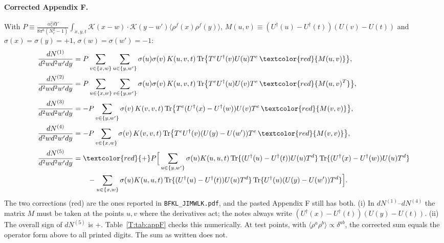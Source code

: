 \documentclass[10pt]{article}
\numberwithin{equation}{section}
\newcommand{\KK}{\mathcal K}
\newcommand{\Ud}{U^{\dagger}}
\newcommand{\Tr}{{\rm Tr}}
\begin{document}
\paragraph{Corrected Appendix F.} With $P\equiv\frac{\alpha_s^2\delta Y}{8\pi^6(N_c^2-1)}\int_{x,y,t}\KK(x-w)\cdot\KK(y-w')\langle\rho^f(x)\rho^f(y)\rangle$, $M(u,v)\equiv(\Ud(u)-\Ud(t))(U(v)-U(t))$ and $\sigma(x)=\sigma(y)=+1$, $\sigma(w)=\sigma(w')=-1$:
\begin{align}
\frac{dN^{(1)}}{d^2wd^2w'dy}&=P\sum_{v\in\{x,w\}}\sum_{u\in\{y,w'\}}\sigma(u)\sigma(v)\,K(u,v,t)\,\Tr\big\{T^e\Ud(v)U(u)T^e\,\textcolor{red}{M(u,v)}\big\},\notag\\
\frac{dN^{(2)}}{d^2wd^2w'dy}&=P\sum_{u\in\{x,w\}}\sum_{v\in\{y,w'\}}\sigma(u)\sigma(v)\,K(u,v,t)\,\Tr\big\{T^e\Ud(u)U(v)T^e\,\textcolor{red}{M(u,v)^T}\big\},\notag\\
\frac{dN^{(3)}}{d^2wd^2w'dy}&=-P\sum_{v\in\{y,w'\}}\sigma(v)\,K(v,v,t)\,\Tr\big\{T^e(\Ud(x)-\Ud(w))U(v)T^e\,\textcolor{red}{M(v,v)}\big\},\notag\\
\frac{dN^{(4)}}{d^2wd^2w'dy}&=-P\sum_{v\in\{x,w\}}\sigma(v)\,K(v,v,t)\,\Tr\big\{T^e\Ud(v)(U(y)-U(w'))T^e\,\textcolor{red}{M(v,v)}\big\},\notag\\
\frac{dN^{(5)}}{d^2wd^2w'dy}&=\textcolor{red}{+}P\Big[\sum_{u\in\{y,w'\}}\sigma(u)K(u,u,t)\,\Tr\{(\Ud(u)-\Ud(t))U(u)T^d\}\,\Tr\{(\Ud(x)-\Ud(w))U(u)T^d\}\notag\\
&\qquad-\sum_{u\in\{x,w\}}\sigma(u)K(u,u,t)\,\Tr\{(\Ud(u)-\Ud(t))U(u)T^d\}\,\Tr\{\Ud(u)(U(y)-U(w'))T^d\}\Big].
\end{align}
The two corrections (red) are the ones reported in \texttt{BFKL\_JIMWLK.pdf}, and the pasted Appendix F still has both. (i) In $dN^{(1)}$--$dN^{(4)}$ the matrix $M$ must be taken at the points $u,v$ where the derivatives act; the notes always write $(\Ud(x)-\Ud(t))(U(y)-U(t))$. (ii) The overall sign of $dN^{(5)}$ is $+$. Table~\ref{T:tab:appF} checks this numerically. At test points, with $\langle\rho^a\rho^b\rangle\propto\delta^{ab}$, the corrected sum equals the operator form above to all printed digits. The sum as written does not.
\end{document}
